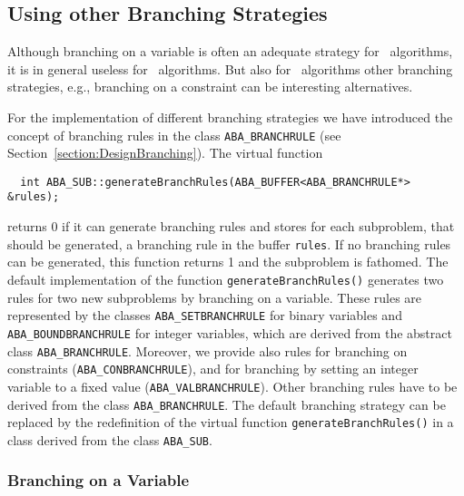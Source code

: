 \subsection{Using other Branching Strategies}
\label{section:otherBranching}

Although branching on a variable is often an adequate strategy for
\bac\ algorithms, it is in general useless for \bap\ algorithms.
But also for \bac\ algorithms other branching strategies, e.g.,
branching on a constraint can be interesting alternatives.

For the implementation of different branching strategies we have
introduced the concept of branching rules in the class 
{\tt ABA\_BRANCHRULE} (see Section~\ref{section:DesignBranching}).
The virtual function
\begin{verbatim}
  int ABA_SUB::generateBranchRules(ABA_BUFFER<ABA_BRANCHRULE*> &rules);
\end{verbatim}
\noindent
returns 0 if it can generate branching rules and stores for each
subproblem, that should be generated, a branching rule in the buffer
{\tt rules}. If no branching rules can be generated, this function
returns 1 and the subproblem is fathomed.
The default implementation of the function {\tt generateBranchRules()}
generates two rules for two new subproblems by branching on a variable.
These rules are represented by the classes 
{\tt ABA\_SETBRANCHRULE} for
binary variables and {\tt ABA\_BOUNDBRANCHRULE}
for integer variables, which
are derived from the abstract class {\tt ABA\_BRANCHRULE}.
Moreover, we provide also rules for branching on constraints
({\tt ABA\_CONBRANCHRULE}), 
and for branching by setting an integer variable
to a fixed value ({\tt ABA\_VALBRANCHRULE}).
Other branching rules have
to be derived from the class {\tt ABA\_BRANCHRULE}. 
The default branching strategy can be replaced by the redefinition
of the virtual function {\tt generateBranch\-Rules()} in a class
derived from the class {\tt ABA\_SUB}.

\subsubsection{Branching on a Variable}

